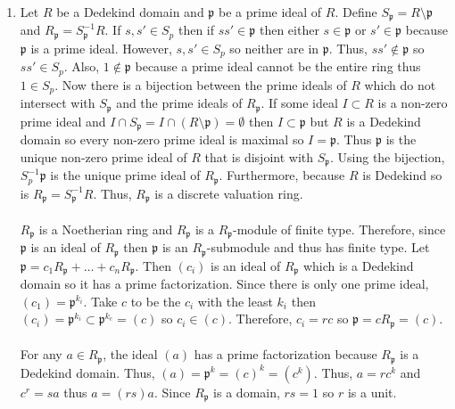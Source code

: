\documentclass[12pt]{extarticle}
\newcommand{\sm}{\! \setminus \!}
\begin{document}
\begin{enumerate}
\begin{enumerate}
\item Let $R$ be a Dedekind domain and $\mathfrak{p}$ be a prime ideal of $R$. Define $S_\mathfrak{p} = R \sm \mathfrak{p}$ and $R_\mathfrak{p} = S_\mathfrak{p}^{-1}R$. If $s, s' \in S_p$ then if $ss' \in \mathfrak{p}$ then either $s \in \mathfrak{p}$ or $s' \in \mathfrak{p}$ because $\mathfrak{p}$ is a prime ideal. However, $s, s' \in S_p$ so neither are in $\mathfrak{p}$. Thus, $ss' \notin \mathfrak{p}$ so $ss' \in S_p$. Also, $1 \notin \mathfrak{p}$ because a prime ideal cannot be the entire ring thus $1 \in S_p$. Now there is a bijection between the prime ideals of $R$ which do not intersect with $S_\mathfrak{p}$ and the prime ideals of $R_\mathfrak{p}$. If some ideal $I \subset R$ is a non-zero prime ideal and $I \cap S_\mathfrak{p} = I \cap (R \sm \mathfrak{p}) = \emptyset$ then $I \subset \mathfrak{p}$ but $R$ is a Dedekind domain so every non-zero prime ideal is maximal so $I = \mathfrak{p}$. Thus $\mathfrak{p}$ is the unique non-zero prime ideal of $R$ that is disjoint with $S_\mathfrak{p}$. Using the bijection, $S_p^{-1} \mathfrak{p}$ is the unique prime ideal of $R_\mathfrak{p}$. Furthermore, because $R$ is Dedekind so is $R_\mathfrak{p} = S_\mathfrak{p}^{-1} R$. Thus, $R_\mathfrak{p}$ is a discrete valuation ring. \\ \\

$R_\mathfrak{p}$ is a Noetherian ring  and $R_\mathfrak{p}$ is a $R_\mathfrak{p}$-module of finite type. Therefore, since $\mathfrak{p}$ is an ideal of $R_\mathfrak{p}$ then $\mathfrak{p}$ is an $R_\mathfrak{p}$-submodule and thus has finite type. Let $ \mathfrak{p} = c_1 R_\mathfrak{p} + \dots + c_n R_\mathfrak{p}$. Then $(c_i)$ is an ideal of $R_\mathfrak{p}$ which is a Dedekind domain so it has a prime factorization. Since there is only one prime ideal, $(c_1) = \mathfrak{p}^{k_i}$. Take $c$ to be the $c_i$ with the least $k_i$ then $(c_i) = \mathfrak{p}^{k_i} \subset \mathfrak{p}^{k_c} = (c)$ so $c_i \in (c)$. Therefore, $c_i = r c$ so $\mathfrak{p} = c R_\mathfrak{p} = (c)$. \\ \\
For any $a \in R_\mathfrak{p}$, the ideal $(a)$ has a prime factorization because $R_\mathfrak{p}$ is a Dedekind domain. Thus, $(a) = \mathfrak{p}^k = (c)^k = (c^k)$. Thus, $a = r c^k$ and $c^r = s a$ thus $a = (rs) a$. Since $R_\mathfrak{p}$ is a domain, $rs = 1$ so $r$ is a unit. 

\end{enumerate}

\end{enumerate}
\end{document}
